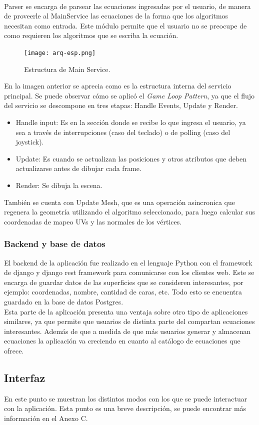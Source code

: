 \documentclass[12pt]{article}
\begin{document}
\\Parser se encarga de parsear las ecuaciones ingresadas por el usuario, de manera de proveerle al MainService las ecuaciones de la forma que los algoritmos necesitan como entrada. Este módulo permite que el usuario no se preocupe de como requieren los algoritmos que se escriba la ecuación.
\clearpage
\begin{figure}[h]
\texttt{[image: arq-esp.png]}
\caption{Estructura de Main Service.}
\end{figure}
En la imagen anterior se aprecia como es la estructura interna del servicio principal. Se puede observar cómo se aplicó el \textit{Game Loop Pattern}, ya que el flujo del servicio se descompone en tres etapas: Handle Events, Update y Render.
\begin{itemize}
\item Handle input: Es en la sección donde se recibe lo que ingresa el usuario, ya sea a través de interrupciones (caso del teclado) o de polling (caso del joystick).
\item Update: Es cuando se actualizan las posiciones y otros atributos que deben actualizarse antes de dibujar cada frame.
\item Render: Se dibuja la escena.
\end{itemize}
También se cuenta con Update Mesh, que es una operación asincronica que regenera la geometría utilizando el algoritmo seleccionado, para luego calcular sus coordenadas de mapeo UVs y las normales de los vértices.
\subsubsection{Backend y base de datos}
El backend de la aplicación fue realizado en el lenguaje Python con el framework de django y django rest framework para comunicarse con los clientes web. Este se encarga de guardar datos de las superficies que se consideren interesantes, por ejemplo: coordenadas, nombre, cantidad de caras, etc. Todo esto se encuentra guardado en la base de datos Postgres.
\\Esta parte de la aplicación presenta una ventaja sobre otro tipo de aplicaciones similares, ya que permite que usuarios de distinta parte del compartan ecuaciones interesantes. Además de que a medida de que más usuarios generar y almacenan ecuaciones la aplicación va creciendo en cuanto al catálogo de ecuaciones que ofrece.
\clearpage
\subsection{Interfaz}
En este punto se muestran los distintos modos con los que se puede interactuar con la aplicación. Esta punto es una breve descripción, se puede encontrar más información en el Anexo C.
\end{document}
